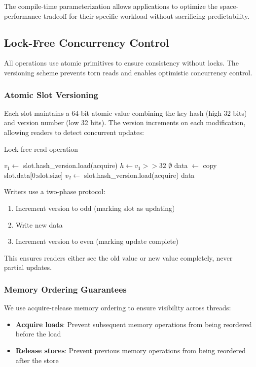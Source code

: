 \documentclass[10pt,conference]{IEEEtran}
\begin{document}
The compile-time parameterization allows applications to optimize the space-performance tradeoff for their specific workload without sacrificing predictability.

\subsection{Lock-Free Concurrency Control}

All operations use atomic primitives to ensure consistency without locks. The versioning scheme prevents torn reads and enables optimistic concurrency control.

\subsubsection{Atomic Slot Versioning}
Each slot maintains a 64-bit atomic value combining the key hash (high 32 bits) and version number (low 32 bits). The version increments on each modification, allowing readers to detect concurrent updates:

\begin{algorithm}
\caption{Lock-free read operation}
\label{alg:read}
\begin{algorithmic}[1]
\REPEAT
\STATE $v_1 \gets$ slot.hash\_version.load(acquire)
\STATE $h \gets v_1 >> 32$ 
\RETURN $\emptyset$ 
\ENDIF
\STATE data $\gets$ copy slot.data[0:slot.size]
\STATE $v_2 \gets$ slot.hash\_version.load(acquire)
 
\RETURN data
\end{algorithmic}
\end{algorithm}

Writers use a two-phase protocol:
\begin{enumerate}
\item Increment version to odd (marking slot as updating)
\item Write new data
\item Increment version to even (marking update complete)
\end{enumerate}

This ensures readers either see the old value or new value completely, never partial updates.

\subsubsection{Memory Ordering Guarantees}
We use acquire-release memory ordering to ensure visibility across threads:
\begin{itemize}
\item \textbf{Acquire loads}: Prevent subsequent memory operations from being reordered before the load
\item \textbf{Release stores}: Prevent previous memory operations from being reordered after the store
\end{itemize}
\end{document}
